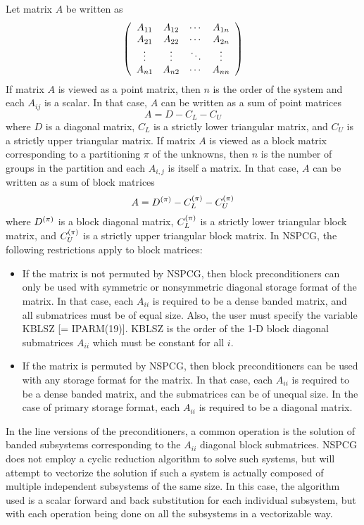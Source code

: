 Let matrix $A$ be written as
\[ \left( \begin{array}{cccc}
                 A_{11} & A_{12} & \cdots & A_{1n} \\
                 A_{21} & A_{22} & \cdots & A_{2n} \\
                 \vdots & \vdots & \ddots & \vdots \\
                 A_{n1} & A_{n2} & \cdots & A_{nn}
  \end{array} \right) \]
If matrix $A$ is viewed as a point matrix, then $n$ is the order of 
the system and each $A_{ij}$ is a scalar.  In that case, $A$ can be
written as a sum of point matrices
\[ A = D - C_L - C_U \]
where $D$ is a diagonal matrix, $C_L$ is a strictly lower triangular
matrix, and $C_U$ is a strictly upper triangular matrix.  If matrix
$A$ is viewed as a block matrix corresponding to a partitioning $\pi$
of the unknowns, then $n$ is the number of groups in the partition
and each $A_{i,j}$ is itself a matrix.  In that case, $A$ can be
written as a sum of block matrices
\[ A = D^{(\pi)} - C_L^{(\pi)} - C_U^{(\pi)} \]
where $D^{(\pi)}$ is a block diagonal matrix, $C_L^{(\pi)}$ is a
strictly lower triangular block matrix, and $C_U^{(\pi)}$ is a
strictly upper triangular block matrix.  In NSPCG, the following
restrictions apply to block matrices:
\begin{itemize}
 \item If the matrix is not permuted by NSPCG, then block preconditioners
       can only be used with symmetric or nonsymmetric diagonal
       storage format of the matrix.  In that case, each $A_{ii}$ 
       is required to be a dense banded matrix, and all submatrices 
       must be of equal size. Also, the user must specify the 
       variable KBLSZ [= IPARM(19)].  KBLSZ is the order of the 
       1-D block diagonal submatrices $A_{ii}$ which must be
       constant for all $i$.  

 \item If the matrix is permuted by NSPCG, then block preconditioners
       can be used with any storage format for the matrix.  In that case,
       each $A_{ii}$ is required to be a dense banded matrix, and the
       submatrices can be of unequal size.  In the case of primary
       storage format, each $A_{ii}$ is required to be a diagonal
       matrix.
\end{itemize}
 
In the line versions of the preconditioners, a common operation is the
solution of banded subsystems corresponding to the $A_{ii}$ diagonal
block submatrices.  NSPCG does not employ a cyclic reduction algorithm
to solve such systems, but will attempt to vectorize the solution if
such a system is actually composed of multiple independent subsystems
of the same size.  In this case, the algorithm used is a scalar
forward and back substitution for each individual subsystem, but
with each operation being done on all the subsystems in a vectorizable
way.

